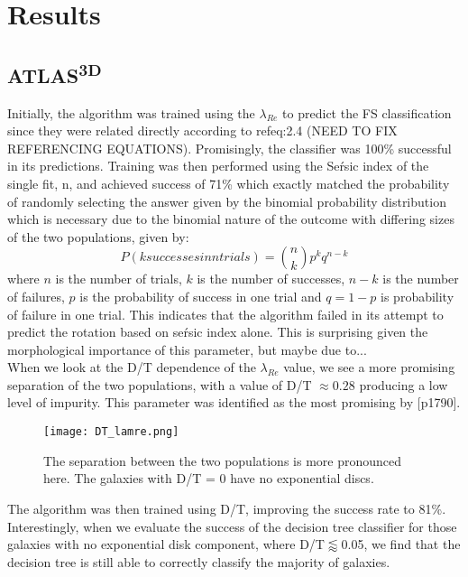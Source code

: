 \chapter{Results}

\label{ch:results}

\section{ATLAS\textsuperscript{3D}}
Initially, the algorithm was trained using the $\lambda_{Re}$ to predict the FS classification since they were related directly according to ref{eq:2.4}
(NEED TO FIX REFERENCING EQUATIONS). Promisingly, the classifier was 100\% successful in its predictions. Training was then performed using the Se\'rsic index of the single fit, n, and achieved success of 71\% which exactly matched the probability of randomly selecting the answer given by the binomial probability distribution which is necessary due to the binomial nature of the outcome with differing sizes of the two populations, given by\cite{simmons_2016}:
\begin{equation}
P(k successes in n trials) = \binom{n}{k}p^{k}q^{n-k}
\end{equation}
where $n$ is the number of trials, $k$ is the number of successes, $n-k$ is the number of failures, $p$ is the probability of success in one trial and $q=1-p$ is probability of failure in one trial. This indicates that the algorithm failed in its attempt to predict the rotation based on se\'rsic index alone. This is surprising given the morphological importance of this parameter, but maybe due to...\\
When we look at the D/T dependence of the $\lambda_{Re}$ value, we see a more promising separation of the two populations, with a value of D/T $\approx 0.28$ producing a low level of impurity. This parameter was identified as the most promising by \cite{Krajnovic2013}[p1790].
\begin{figure}[h]
	\caption{The separation between the two populations is more pronounced here. The galaxies with D/T = 0 have no exponential discs.
	}
	\centering
	\texttt{[image: DT\_lamre.png]}
	\label{fig:dtlamre}
\end{figure}
The algorithm was then trained using D/T, improving the success rate to 81\%. Interestingly, when we evaluate the success of the decision tree classifier for those galaxies with no exponential disk component, where D/T$\lessapprox $0.05, we find that the decision tree is still able to correctly classify the majority of galaxies.